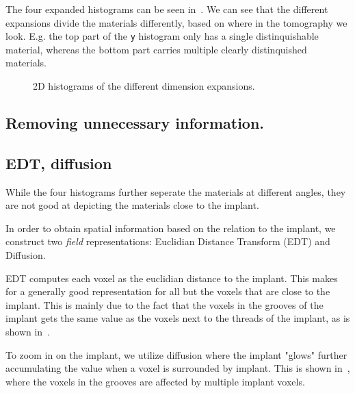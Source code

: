 The four expanded histograms can be seen in~.
We can see that the different expansions divide the materials differently, based on where in the tomography we look.
E.g. the top part of the \texttt{y} histogram only has a single distinquishable material, whereas the bottom part carries multiple clearly distinquished materials.

\begin{figure}
    \centering
    \caption{2D histograms of the different dimension expansions.}
    \label{fig:2dhists}
\end{figure}

\subsection{Removing unnecessary information.}

\subsection{EDT, diffusion}
While the four histograms further seperate the materials at different angles, they are not good at depicting the materials close to the implant.

In order to obtain spatial information based on the relation to the implant, we construct two \emph{field} representations: Euclidian Distance Transform (EDT) and Diffusion.

EDT computes each voxel as the euclidian distance to the implant. This makes for a generally good representation for all but the voxels that are close to the implant. This is mainly due to the fact that the voxels in the grooves of the implant gets the same value as the voxels next to the threads of the implant, as is shown in~.

To zoom in on the implant, we utilize diffusion where the implant "glows" further accumulating the value when a voxel is surrounded by implant. This is shown in~, where the voxels in the grooves are affected by multiple implant voxels.

